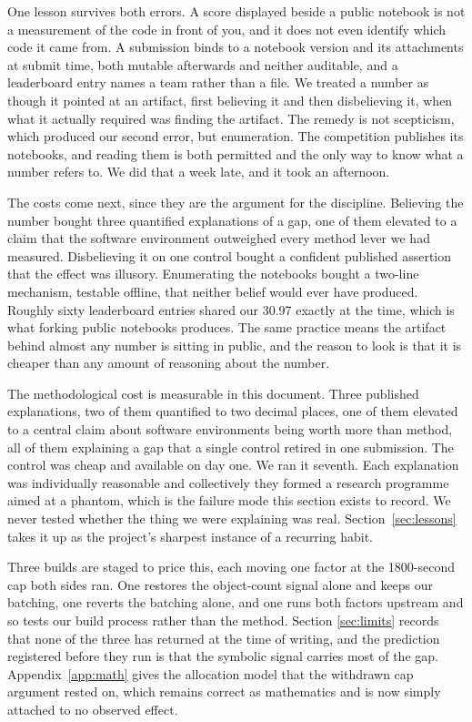 \documentclass[11pt]{article}
\begin{document}
One lesson survives both errors. A score displayed beside a public
notebook is not a measurement of the code in front of you, and it does not even identify which code it
came from. A submission binds to a notebook version and its attachments at submit time, both mutable
afterwards and neither auditable, and a leaderboard entry names a team rather than a file. We treated a
number as though it pointed at an artifact, first believing it and then disbelieving it, when what it
actually required was finding the artifact. The remedy is not scepticism, which produced our second
error, but enumeration. The competition publishes its notebooks, and reading them is both permitted and
the only way to know what a number refers to. We did that a week late, and it took an afternoon.

The costs come next, since they are the argument for the discipline. Believing the number bought three quantified explanations of a gap, one of them
elevated to a claim that the software environment outweighed every method lever we had measured.
Disbelieving it on one control bought a confident published assertion that the effect was illusory.
Enumerating the notebooks bought a two-line mechanism, testable offline, that neither belief would ever
have produced. Roughly sixty leaderboard entries shared our 30.97 exactly at the time, which is what forking public
notebooks produces. The same practice means the artifact behind almost any number is sitting in public,
and the reason to look is that it is cheaper than any amount of reasoning about the number.

The methodological cost is measurable in this document. Three published explanations, two of them
quantified to two decimal places, one of them elevated to a central claim about software environments
being worth more than method, all of them explaining a gap that a single control retired in one
submission. The control was cheap and available on day one. We ran it seventh. Each explanation was
individually reasonable and collectively they formed a research programme aimed at a phantom, which is
the failure mode this section exists to record. We never tested whether the thing we were explaining was
real. Section~\ref{sec:lessons} takes it up as the project's sharpest instance of a recurring habit.

Three builds are staged to price this, each moving one factor at the 1800-second cap both sides ran.
One restores the object-count signal alone and keeps our batching, one reverts the batching alone, and
one runs both factors upstream and so tests our build process rather than the method. Section
\ref{sec:limits} records that none of the three has returned at the time of writing, and the prediction
registered before they run is that the symbolic signal carries most of the gap. Appendix~\ref{app:math}
gives the allocation model that the withdrawn cap argument rested on, which remains correct as
mathematics and is now simply attached to no observed effect.
\end{document}
